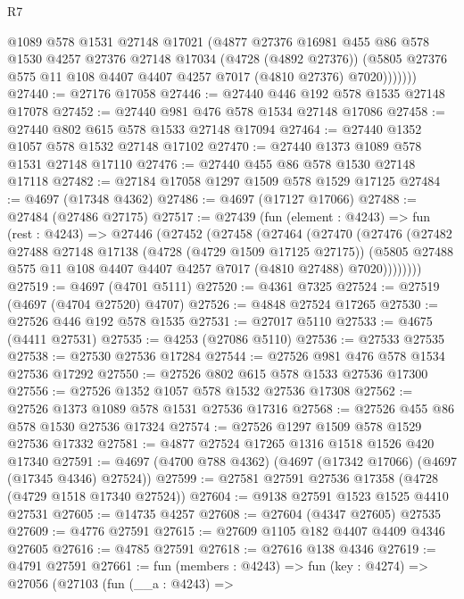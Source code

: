 \begin{lexlean}{R7}
\begin{coremodule}
              @1089
              @578
              @1531
              @27148
              @17021
              (@4877
                @27376
                @16981
                @455
                @86
                @578
                @1530
                @4257
                @27376
                @27148
                @17034
                (@4728 (@4892 @27376))
                (@5805 @27376 @575 @11 @108 @4407 @4407 @4257 @7017 (@4810 @27376) @7020)))))))
@27440 := @27176 @17058
@27446 := @27440 @446 @192 @578 @1535 @27148 @17078
@27452 := @27440 @981 @476 @578 @1534 @27148 @17086
@27458 := @27440 @802 @615 @578 @1533 @27148 @17094
@27464 := @27440 @1352 @1057 @578 @1532 @27148 @17102
@27470 := @27440 @1373 @1089 @578 @1531 @27148 @17110
@27476 := @27440 @455 @86 @578 @1530 @27148 @17118
@27482 := @27184 @17058 @1297 @1509 @578 @1529 @17125
@27484 := @4697 (@17348 @4362)
@27486 := @4697 (@17127 @17066)
@27488 := @27484 (@27486 @27175)
@27517 := @27439
    (fun (element : @4243) =>
    fun (rest : @4243) =>
    @27446
      (@27452
        (@27458
          (@27464
            (@27470
              (@27476
                (@27482
                  @27488
                  @27148
                  @17138
                  (@4728 (@4729 @1509 @17125 @27175))
                  (@5805 @27488 @575 @11 @108 @4407 @4407 @4257 @7017 (@4810 @27488) @7020))))))))
@27519 := @4697 (@4701 @5111)
@27520 := @4361 @7325
@27524 := @27519 (@4697 (@4704 @27520) @4707)
@27526 := @4848 @27524 @17265
@27530 := @27526 @446 @192 @578 @1535
@27531 := @27017 @5110
@27533 := @4675 (@4411 @27531)
@27535 := @4253 (@27086 @5110)
@27536 := @27533 @27535
@27538 := @27530 @27536 @17284
@27544 := @27526 @981 @476 @578 @1534 @27536 @17292
@27550 := @27526 @802 @615 @578 @1533 @27536 @17300
@27556 := @27526 @1352 @1057 @578 @1532 @27536 @17308
@27562 := @27526 @1373 @1089 @578 @1531 @27536 @17316
@27568 := @27526 @455 @86 @578 @1530 @27536 @17324
@27574 := @27526 @1297 @1509 @578 @1529 @27536 @17332
@27581 := @4877 @27524 @17265 @1316 @1518 @1526 @420 @17340
@27591 := @4697 (@4700 @788 @4362) (@4697 (@17342 @17066) (@4697 (@17345 @4346) @27524))
@27599 := @27581 @27591 @27536 @17358 (@4728 (@4729 @1518 @17340 @27524))
@27604 := @9138 @27591 @1523 @1525 @4410 @27531
@27605 := @14735 @4257
@27608 := @27604 (@4347 @27605) @27535
@27609 := @4776 @27591
@27615 := @27609 @1105 @182 @4407 @4409 @4346 @27605
@27616 := @4785 @27591
@27618 := @27616 @138 @4346
@27619 := @4791 @27591
@27661 := fun (members : @4243) =>
  fun (key : @4274) =>
  @27056
    (@27103
      (fun (__a : @4243) =>

\end{coremodule}
\end{lexlean}
